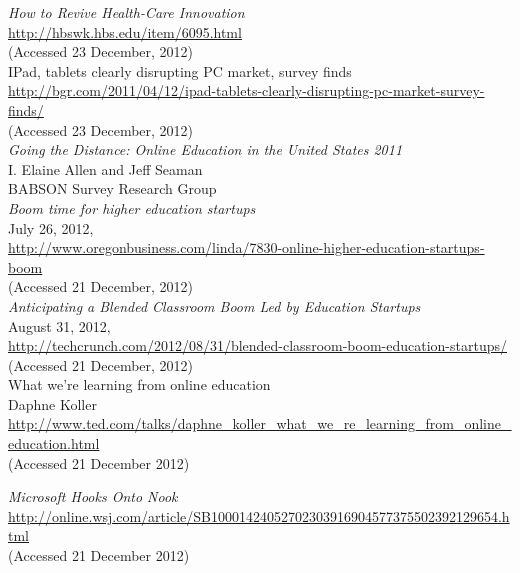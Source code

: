 \documentclass[a4paper,10pt]{book}
\begin{document}
\begin{thebibliography}{9}
  \emph{How to Revive Health-Care Innovation}\\
  \url{http://hbswk.hbs.edu/item/6095.html}\\
  (Accessed 23 December, 2012)\\
 

IPad, tablets clearly disrupting PC market, survey finds\\
\url{http://bgr.com/2011/04/12/ipad-tablets-clearly-disrupting-pc-market-survey-finds/}\\
  (Accessed 23 December, 2012)\\
 
  \emph{Going the Distance: Online Education in the United States 2011}\\
  I. Elaine Allen and Jeff Seaman\\
  BABSON Survey Research Group\\

  \emph{Boom time for higher education startups}\\ 
  July 26, 2012,\\
  \url{http://www.oregonbusiness.com/linda/7830-online-higher-education-startups-boom}\\
  (Accessed 21 December, 2012)\\

  \emph{Anticipating a Blended Classroom Boom Led by Education Startups}\\ 
  August 31, 2012,\\
  \url{  http://techcrunch.com/2012/08/31/blended-classroom-boom-education-startups/}\\
  (Accessed 21 December, 2012)\\

What we're learning from online education \\
Daphne Koller\\
\url{http://www.ted.com/talks/daphne_koller_what_we_re_learning_from_online_education.html}\\
  (Accessed 21 December 2012)

   \emph{Microsoft Hooks Onto Nook}\\
   \url{http://online.wsj.com/article/SB10001424052702303916904577375502392129654.html}\\
   (Accessed 21 December 2012)
   

\end{thebibliography}
\end{document}
